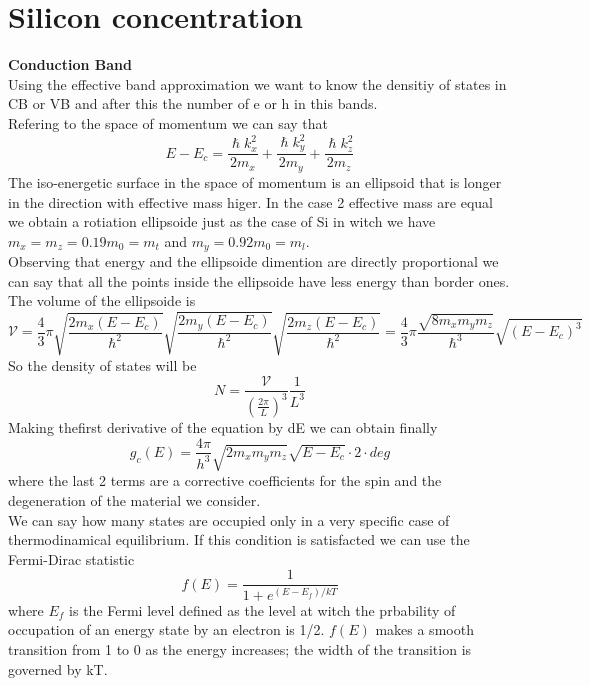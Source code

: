 \section{Silicon concentration}
{\bf Conduction Band}\\
Using the effective band approximation we want to know the densitiy of states in CB or VB and after this the number of e or h in this bands.\\
Refering to the space of momentum we can say that
\begin{equation}
E-E_c=\frac{\hslash k_x^2}{2m_x}+\frac{\hslash k_y^2}{2m_y}+\frac{\hslash k_z^2}{2m_z}
\end{equation}
The iso-energetic surface in the space of momentum is an ellipsoid that is longer in the direction with effective mass higer. In the case 2 effective mass are equal we obtain a rotiation ellipsoide just as the case of Si in witch we have $m_x=m_z=0.19m_0=m_t$ and $m_y=0.92m_0=m_l$.\\
Observing that energy and the ellipsoide dimention are directly proportional we can say that all the points inside the ellipsoide have less energy than border ones.\\
The volume of the ellipsoide is 
\begin{equation}
\mathcal{V}=\frac{4}{3}\pi \sqrt{\frac{2m_x(E-E_c)}{\hslash^2}}\sqrt{\frac{2m_y(E-E_c)}{\hslash^2}}\sqrt{\frac{2m_z(E-E_c)}{\hslash^2}}=\frac{4}{3}\pi\frac{\sqrt{8m_xm_ym_z}}{\hslash^3}\sqrt{(E-E_c)^3}
\end{equation}
So the density of states will be 
\begin{equation}
N=\frac{\mathcal{V}}{(\frac{2\pi}{L})^3}\frac{1}{L^3}
\end{equation}
Making thefirst derivative of the equation by dE we can obtain finally 
\begin{equation}
g_c(E)=\frac{4\pi}{h^3}\sqrt{2m_xm_ym_z}\sqrt{E-E_c}\cdot 2 \cdot deg
\end{equation}
where the last 2 terms are a corrective coefficients for the spin and the degeneration of the material we consider.\\
We can say how many states are occupied only in a very specific case of thermodinamical equilibrium. If this condition is satisfacted we can use the Fermi-Dirac statistic 
\begin{equation}
f(E)=\frac{1}{1+e^{(E-E_f)/kT}}
\end{equation}
where $E_f$ is the Fermi level defined as the level at witch the prbability of occupation of an energy state by an electron is 1/2. $f(E)$ makes a smooth transition from 1 to 0 as the energy increases; the width of the transition is governed by kT.
